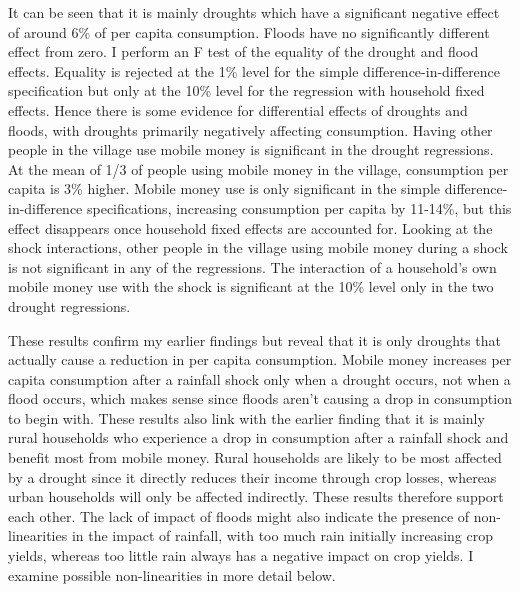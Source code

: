 It can be seen that it is mainly droughts which have a significant negative effect of around 6\% of per capita consumption. Floods have no significantly different effect from zero. I perform an F test of the equality of the drought and flood effects. Equality is rejected at the 1\% level  for the simple difference-in-difference specification but only at the 10\% level for the regression with household fixed effects. Hence there is some evidence for differential effects of droughts and floods, with droughts primarily negatively affecting consumption. Having other people in the village use mobile money is significant in the drought regressions. At the mean of 1/3 of people using mobile money in the village, consumption per capita is 3\% higher. Mobile money use is only significant in the simple difference-in-difference specifications, increasing consumption per capita by 11-14\%, but this effect disappears once household fixed effects are accounted for. Looking at the shock interactions, other people in the village using mobile money during a shock is not significant in any of the regressions. The interaction of a household's own mobile money use with the shock is significant at the 10\% level only in the two drought regressions. 

These results confirm my earlier findings but reveal that it is only droughts that actually cause a reduction in per capita consumption. Mobile money increases per capita consumption after a rainfall shock only when a drought  occurs, not when a flood occurs, which makes sense since floods aren't causing a drop in consumption to begin with. These results also link with the earlier finding that it is mainly rural households who experience a drop in consumption after a rainfall shock and benefit most from mobile money. Rural households are likely to be most affected by a drought since it directly reduces their income through crop losses, whereas urban households will only be affected indirectly. These results therefore support each other. The lack of impact of floods might also indicate the presence of non-linearities in the impact of rainfall, with too much rain initially increasing crop yields, whereas too little rain always has a negative impact on crop yields. I examine possible non-linearities in more detail below.



